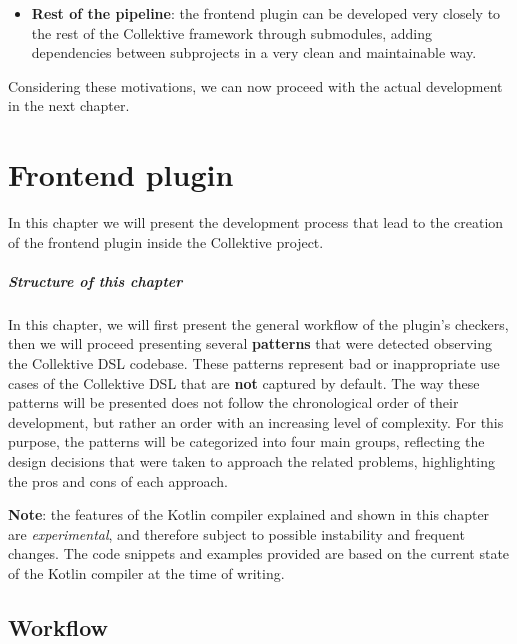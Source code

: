 \documentclass[12pt,a4paper,openright,twoside]{book}
\begin{document}
\begin{enumerate}
\begin{itemize}
    \item \textbf{Rest of the pipeline}: the frontend plugin can be developed 
    very closely to the rest of the Collektive framework through submodules,
    adding dependencies between subprojects in a very clean and maintainable
    way.
  \end{itemize}
\end{enumerate}

Considering these motivations, we can now proceed with the actual development in
the next chapter.

\chapter{Frontend plugin}
\label{chap:contribution}

In this chapter we will present the development process that lead to the creation of 
the frontend plugin inside the Collektive project.

\paragraph{Structure of this chapter}

In this chapter, we will first present the general workflow of the plugin's
checkers, then we will proceed presenting several \textbf{patterns} that were
detected observing the Collektive DSL codebase. These patterns represent bad or
inappropriate use cases of the Collektive DSL that are \textbf{not} captured by 
default. 
%
The way these patterns will be presented does not follow the chronological order 
of their development, but rather an order with an increasing level of complexity.
For this purpose, the patterns will be categorized into four main groups, 
reflecting the design decisions that were taken to approach the related problems,
highlighting the pros and cons of each approach. 

\textbf{Note}: the features of the Kotlin compiler explained and shown in
this chapter are \emph{experimental}, and therefore subject to possible instability
and frequent changes. The code snippets and examples provided are based on the
current state of the Kotlin compiler at the time of writing. 

\section{Workflow}
\end{document}
